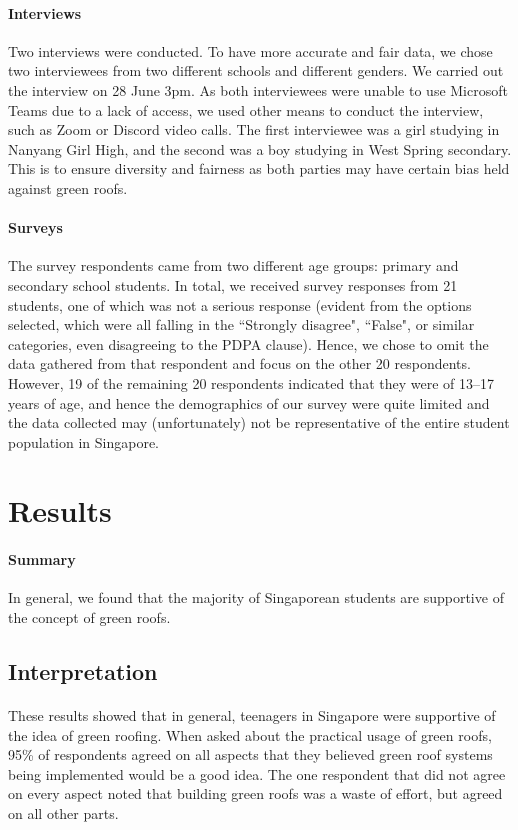 \documentclass{article}
\begin{document}
\begin{multicols}{2}
  \paragraph{Interviews} Two interviews were conducted. To have more
  accurate and fair data, we chose two interviewees from two different
  schools and different genders. We carried out the interview on 28 June
  3pm. As both interviewees were unable to use Microsoft Teams due to a
  lack of access, we used other means to conduct the interview, such as
  Zoom or Discord video calls. The first interviewee was a girl studying
  in Nanyang Girl High, and the second was a boy studying in West Spring
  secondary. This is to ensure diversity and fairness as both parties
  may have certain bias held against green roofs.

  \paragraph{Surveys} The survey respondents came from two different
  age groups: primary and secondary school students. In total, we
  received survey responses from 21 students, one of which was not
  a serious response (evident from the options selected, which were
  all falling in the ``Strongly disagree", ``False", or similar
  categories, even disagreeing to the PDPA clause). Hence, we chose to
  omit the data gathered from that respondent and focus on the other
  20 respondents. However, 19 of the remaining 20 respondents indicated
  that they were of 13--17 years of age, and hence the demographics of our
  survey were quite limited and the data collected may (unfortunately)
  not be representative of the entire student population in Singapore.


  \section{Results}
  \paragraph{Summary} In general, we found that the majority of
  Singaporean students are supportive of the concept of green roofs.

  \subsection{Interpretation}
  \paragraph{} These results showed that in general, teenagers in
  Singapore were supportive of the idea of green roofing. When asked about
  the practical usage of green roofs, 95\% of respondents agreed on all
  aspects that they believed green roof systems being implemented would
  be a good idea. The one respondent that did not agree on every aspect
  noted that building green roofs was a waste of effort, but agreed on
  all other parts. 


\end{multicols}
\end{document}
